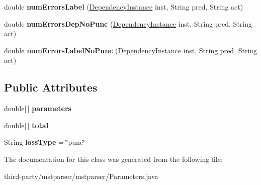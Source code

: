 \begin{DoxyCompactItemize}
\item 
\hypertarget{classmstparser_1_1Parameters_a176a90f57acf8874e7241912d6b48d62}{
double {\bfseries numErrorsLabel} (\hyperlink{classmstparser_1_1DependencyInstance}{DependencyInstance} inst, String pred, String act)}
\label{classmstparser_1_1Parameters_a176a90f57acf8874e7241912d6b48d62}

\item 
\hypertarget{classmstparser_1_1Parameters_a99c098d3c2ec76e3e59bf4c27ed2a509}{
double {\bfseries numErrorsDepNoPunc} (\hyperlink{classmstparser_1_1DependencyInstance}{DependencyInstance} inst, String pred, String act)}
\label{classmstparser_1_1Parameters_a99c098d3c2ec76e3e59bf4c27ed2a509}

\item 
\hypertarget{classmstparser_1_1Parameters_a4c46c8ffe2423b360ef05e8737550045}{
double {\bfseries numErrorsLabelNoPunc} (\hyperlink{classmstparser_1_1DependencyInstance}{DependencyInstance} inst, String pred, String act)}
\label{classmstparser_1_1Parameters_a4c46c8ffe2423b360ef05e8737550045}

\end{DoxyCompactItemize}
\subsection*{Public Attributes}
\begin{DoxyCompactItemize}
\item 
\hypertarget{classmstparser_1_1Parameters_a6ff77d59c53d52c1dcb02443e92c8864}{
double\mbox{[}$\,$\mbox{]} {\bfseries parameters}}
\label{classmstparser_1_1Parameters_a6ff77d59c53d52c1dcb02443e92c8864}

\item 
\hypertarget{classmstparser_1_1Parameters_a9aad3a3d74cf6e0021b8b236b5a2cb9c}{
double\mbox{[}$\,$\mbox{]} {\bfseries total}}
\label{classmstparser_1_1Parameters_a9aad3a3d74cf6e0021b8b236b5a2cb9c}

\item 
\hypertarget{classmstparser_1_1Parameters_ad01a01b3dbbd5cebf705ea187766e7d7}{
String {\bfseries lossType} = \char`\"{}punc\char`\"{}}
\label{classmstparser_1_1Parameters_ad01a01b3dbbd5cebf705ea187766e7d7}

\end{DoxyCompactItemize}


The documentation for this class was generated from the following file:\begin{DoxyCompactItemize}
\item 
third-\/party/mstparser/mstparser/Parameters.java\end{DoxyCompactItemize}
